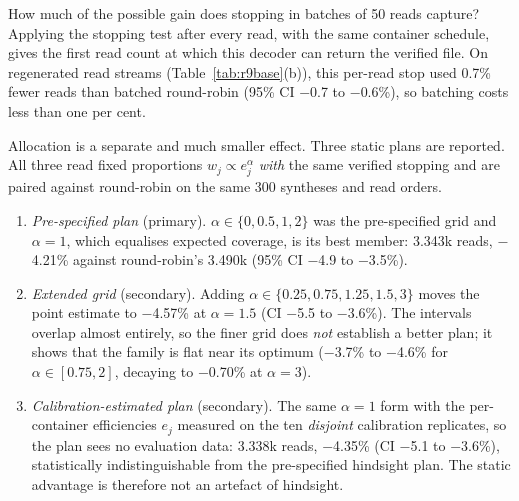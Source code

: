 \documentclass[conference,onecolumn,11pt]{IEEEtran}
\begin{document}
How much of the possible gain does stopping in batches of 50 reads capture?  Applying the stopping test
after every read, with the same container schedule, gives the first read count at which this decoder can
return the verified file.  On regenerated read streams (Table~\ref{tab:r9base}(b)), this per-read stop
used 0.7\% fewer reads than batched round-robin (95\% CI $-$0.7 to $-$0.6\%), so batching costs less
than one per cent.

Allocation is a separate and much smaller effect.  Three static plans are reported.  All three read fixed
proportions $w_j\propto e_j^{\alpha}$ \emph{with} the same verified stopping and are paired against
round-robin on the same 300 syntheses and read orders.
\begin{enumerate}
\item \emph{Pre-specified plan} (primary).  $\alpha\in\{0,0.5,1,2\}$ was the pre-specified grid and
$\alpha{=}1$, which equalises expected coverage, is its best member: 3.343k reads, $-$4.21\% against
round-robin's 3.490k (95\% CI $-$4.9 to $-$3.5\%).
\item \emph{Extended grid} (secondary).  Adding $\alpha\in\{0.25,0.75,1.25,1.5,3\}$ moves the point
estimate to $-$4.57\% at $\alpha{=}1.5$ (CI $-$5.5 to $-$3.6\%).  The intervals overlap almost entirely, so
the finer grid does \emph{not} establish a better plan; it shows that the family is flat near its
optimum ($-$3.7\% to $-$4.6\% for $\alpha\in[0.75,2]$, decaying to $-$0.70\% at $\alpha{=}3$).
\item \emph{Calibration-estimated plan} (secondary).  The same $\alpha{=}1$ form with the per-container
efficiencies $e_j$ measured on the ten \emph{disjoint} calibration replicates, so the plan sees no
evaluation data: 3.338k reads, $-$4.35\% (CI $-$5.1 to $-$3.6\%), statistically indistinguishable from the
pre-specified hindsight plan.  The static advantage is therefore not an artefact of hindsight.
\end{enumerate}
\end{document}
